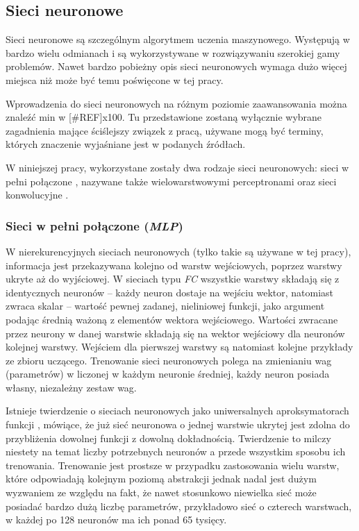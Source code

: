 \subsection{Sieci neuronowe}
\label{subsec:nn}

Sieci neuronowe  są szczególnym algorytmem uczenia maszynowego. Występują w bardzo wielu odmianach i są wykorzystywane w rozwiązywaniu szerokiej gamy problemów. Nawet bardzo pobieżny opis sieci neuronowych wymaga dużo więcej miejsca niż może być temu poświęcone w tej pracy. 

Wprowadzenia do sieci neuronowych na różnym poziomie zaawansowania można znaleźć min w [\#REF]x100. 
Tu przedstawione zostaną wyłącznie wybrane zagadnienia mające ściślejszy związek z pracą, używane mogą być terminy, których znaczenie wyjaśniane jest w podanych źródłach.

W niniejszej pracy, wykorzystane zostały dwa rodzaje sieci neuronowych: sieci w pełni połączone , nazywane także wielowarstwowymi perceptronami  oraz sieci konwolucyjne . 

\subsubsection*{Sieci w pełni połączone (\textit{MLP})}
W nierekurencyjnych sieciach neuronowych (tylko takie są używane w tej pracy), informacja jest przekazywana kolejno od warstw wejściowych, poprzez warstwy ukryte aż do wyjściowej. 
W sieciach typu \textit{FC} wszystkie warstwy składają się z identycznych neuronów -- każdy neuron dostaje na wejściu wektor, natomiast zwraca skalar -- wartość pewnej zadanej, nieliniowej funkcji, jako argument podając średnią ważoną z elementów wektora wejściowego. Wartości zwracane przez neurony w danej warstwie składają się na wektor wejściowy dla neuronów kolejnej warstwy. Wejściem dla pierwszej warstwy są natomiast kolejne przykłady ze zbioru uczącego. Trenowanie sieci neuronowych polega na zmienianiu wag (parametrów) w liczonej w każdym neuronie średniej, każdy neuron posiada własny, niezależny zestaw wag.

Istnieje twierdzenie o sieciach neuronowych jako uniwersalnych aproksymatorach funkcji , mówiące, że już sieć neuronowa o jednej warstwie ukrytej jest zdolna do przybliżenia dowolnej funkcji z dowolną dokładnością. Twierdzenie to milczy niestety na temat liczby potrzebnych neuronów a przede wszystkim sposobu ich trenowania. 
Trenowanie jest prostsze w przypadku zastosowania wielu warstw, które odpowiadają kolejnym poziomą abstrakcji jednak nadal jest dużym wyzwaniem ze względu na fakt, że nawet stosunkowo niewielka sieć może posiadać bardzo dużą liczbę parametrów, przykładowo sieć o czterech warstwach, w każdej po 128 neuronów ma ich ponad 65 tysięcy.


